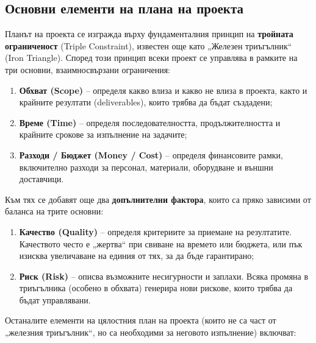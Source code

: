 \documentclass{scrartcl}
\begin{document}
\begin{FlushLeft}
\subsection{Основни елементи на плана на проекта}

Планът на проекта се изгражда върху фундаменталния принцип на \textbf{тройната ограниченост} (Triple Constraint), известен още като „Железен триъгълник“ (Iron Triangle). Според този принцип всеки проект се управлява в рамките на три основни, взаимносвързани ограничения:

\begin{enumerate}
    \item \textbf{Обхват (Scope)} – определя какво влиза и какво не влиза в проекта, както и крайните резултати (deliverables), които трябва да бъдат създадени;
    \item \textbf{Време (Time)} – определя последователността, продължителността и крайните срокове за изпълнение на задачите;
    \item \textbf{Разходи / Бюджет (Money / Cost)} – определя финансовите рамки, включително разходи за персонал, материали, оборудване и външни доставчици.
\end{enumerate}

\begin{center}
\end{center}

Към тях се добавят още два \textbf{допълнителни фактора}, които са пряко зависими от баланса на трите основни:

\begin{enumerate}[resume]
    \item \textbf{Качество (Quality)} – определя критериите за приемане на резултатите. Качеството често е „жертва“ при свиване на времето или бюджета, или пък изисква увеличаване на единия от тях, за да бъде гарантирано;
    \item \textbf{Риск (Risk)} – описва възможните несигурности и заплахи. Всяка промяна в триъгълника (особено в обхвата) генерира нови рискове, които трябва да бъдат управлявани.
\end{enumerate}

Останалите елементи на цялостния план на проекта (които не са част от „железния триъгълник“, но са необходими за неговото изпълнение) включват:


\end{FlushLeft}
\end{document}
